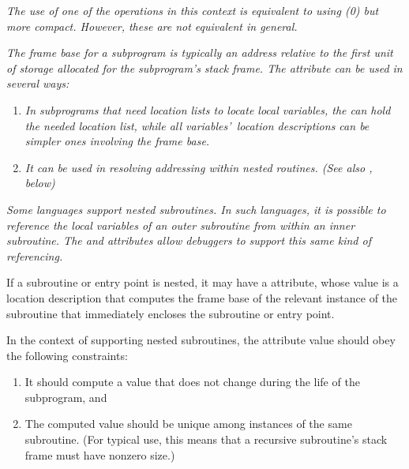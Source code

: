 \textit{The use of one of the \DWOPregn{} 
operations in this
context is equivalent to using 
\DWOPbregn(0) 
but more
compact. However, these are not equivalent in general.}

\textit{The frame base for a subprogram is typically an address
relative to the first unit of storage allocated for the
subprogram\textquoteright s stack frame. The \DWATframebase{} attribute
can be used in several ways:}
\begin{enumerate}[1. ]
\item \textit{In subprograms that need 
location lists to locate local
variables, the \DWATframebase{} can hold the needed location
list, while all variables\textquoteright\  location descriptions can be
simpler ones involving the frame base.}

\item \textit{It can be used in resolving  addressing
within nested routines. 
(See also \DWATstaticlink, below)}
\end{enumerate}

\textit{Some languages support nested subroutines. In such languages,
it is possible to reference the local variables of an
outer subroutine from within an inner subroutine. The
\DWATstaticlink{} and \DWATframebase{} attributes allow
debuggers to support this same kind of referencing.}

If 
\hypertarget{chap:DWATstaticlinklocationofuplevelframe}{}
a 
subroutine or entry point is nested, it may have a
\DWATstaticlinkDEFN{}
attribute, whose value is a location
description that computes the frame base of the relevant
instance of the subroutine that immediately encloses the
subroutine or entry point.

In the context of supporting nested subroutines, the
\DWATframebase{} attribute value should obey the following
constraints:

\begin{enumerate}[1. ]
\item It should compute a value that does not change during the
life of the subprogram, and

\item The computed value should be unique among instances of
the same subroutine. (For typical \DWATframebase{} use, this
means that a recursive subroutine\textquoteright s stack frame must have
non\dash zero size.)
\end{enumerate}

